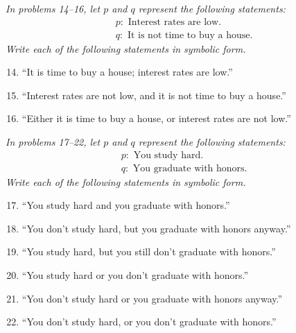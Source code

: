 \emph{In problems 14--16, let $p$ and $q$ represent the following statements:}
\begin{align*}
&p: \textrm{ Interest rates are low.}\\
&q: \textrm{ It is not time to buy a house.}
\end{align*}
\emph{Write each of the following statements in symbolic form.}
\begin{enumerate}
\setcounter{enumi}{13}

\item ``It is time to buy a house; interest rates are low.'' 

\item ``Interest rates are not low, and it is not time to buy a house.'' 

\item ``Either it is time to buy a house, or interest rates are not low.'' 
\end{enumerate}

\emph{In problems 17--22, let $p$ and $q$ represent the following statements:}
\begin{align*}
&p: \textrm{ You study hard.}\\
&q: \textrm{ You graduate with honors.}
\end{align*}
\emph{Write each of the following statements in symbolic form.}
\begin{enumerate}
\setcounter{enumi}{16}

\item ``You study hard and you graduate with honors.'' 

\item ``You don't study hard, but you graduate with honors anyway.'' 

\item ``You study hard, but you still don't graduate with honors.'' 

\item ``You study hard or you don't graduate with honors.'' 

\item ``You don't study hard or you graduate with honors anyway.'' 

\item ``You don't study hard, or you don't graduate with honors.'' 
\end{enumerate}


